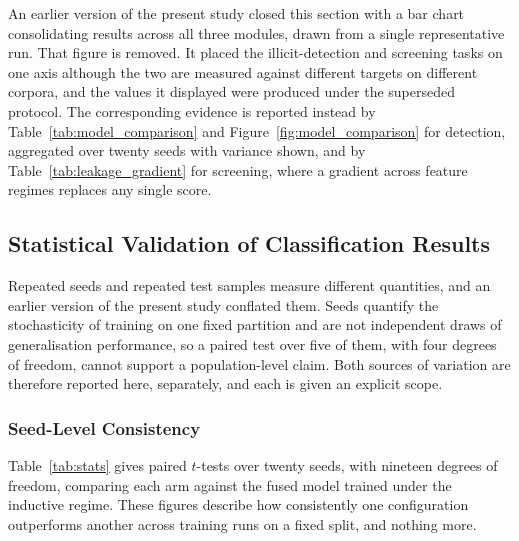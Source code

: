 \documentclass[12pt,a4paper]{article}
\begin{document}
An earlier version of the present study closed this section with
a bar chart consolidating results across all three modules,
drawn from a single representative run. That figure is removed.
It placed the illicit-detection and screening tasks on one axis
although the two are measured against different targets on
different corpora, and the values it displayed were produced
under the superseded protocol. The corresponding evidence is
reported instead by Table~\ref{tab:model_comparison} and
Figure~\ref{fig:model_comparison} for detection, aggregated over
twenty seeds with variance shown, and by
Table~\ref{tab:leakage_gradient} for screening, where a gradient
across feature regimes replaces any single score.


\subsection{Statistical Validation of Classification Results}
\label{sec:stats}

Repeated seeds and repeated test samples measure different
quantities, and an earlier version of the present study conflated
them. Seeds quantify the stochasticity of training on one fixed
partition and are not independent draws of generalisation
performance, so a paired test over five of them, with four
degrees of freedom, cannot support a population-level claim. Both
sources of variation are therefore reported here, separately, and
each is given an explicit scope.

\subsubsection{Seed-Level Consistency}

Table~\ref{tab:stats} gives paired $t$-tests over twenty seeds,
with nineteen degrees of freedom, comparing each arm against the
fused model trained under the inductive regime. These figures
describe how consistently one configuration outperforms another
across training runs on a fixed split, and nothing more.
\end{document}
